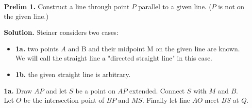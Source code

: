 \textbf{Prelim 1.} Construct a line through point $P$ parallel to a given line. ($P$ is not on the given line.)

\textbf{Solution.} Steiner considers two cases: 
\begin{itemize}
\item \textbf{1a.} two points $A$ and B and their midpoint M on the given line are known. We will call the straight line a "directed straight line" in this case.
\item \textbf{1b.} the given straight line is arbitrary. 
\end{itemize}

\textbf{1a.} Draw $AP$ and let $S$ be a point on $AP$ extended. Connect $S$ with $M$ and $B$. Let $O$ be the intersection point of $BP$ and $MS$. Finally let line $AO$ meet $BS$ at $Q$.

